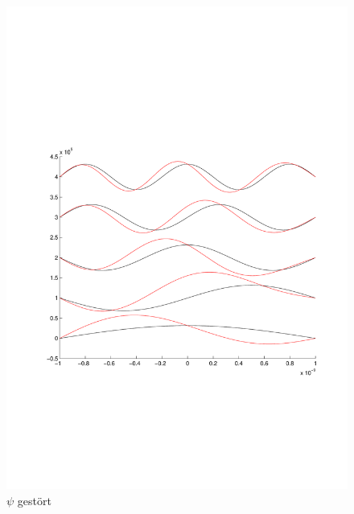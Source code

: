 \begin{refsection}
\begin{figure}
 \centering
 \includegraphics[width=12cm,clip=true,trim=2cm 7cm 1cm 8cm]{efeld/Psi_gestoert.pdf}
 \caption{$\psi$ gest\"ort}
 \label{abb:efeld_psi_gestoert}
\end{figure}



\end{refsection}
